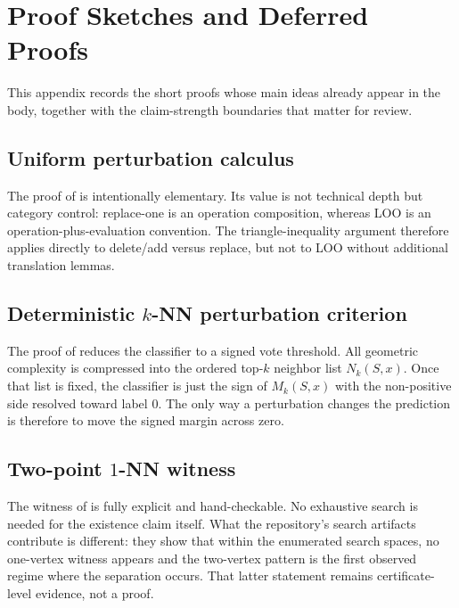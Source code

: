\section{Proof Sketches and Deferred Proofs}

This appendix records the short proofs whose main ideas already appear in the
body, together with the claim-strength boundaries that matter for review.

\subsection{Uniform perturbation calculus}

The proof of  is intentionally elementary. Its
value is not technical depth but category control: replace-one is an operation
composition, whereas LOO is an operation-plus-evaluation convention. The
triangle-inequality argument therefore applies directly to delete/add versus
replace, but not to LOO without additional translation lemmas.

\subsection[Deterministic k-NN perturbation criterion]{Deterministic $k$-NN perturbation criterion}

The proof of  reduces the classifier to a signed vote
threshold. All geometric complexity is compressed into the ordered top-$k$
neighbor list $N_k(S,x)$. Once that list is fixed, the classifier is just the
sign of $M_k(S,x)$ with the non-positive side resolved toward label $0$. The
only way a perturbation changes the prediction is therefore to move the signed
margin across zero.

\subsection[Two-point 1-NN witness]{Two-point $1$-NN witness}

The witness of  is fully explicit and
hand-checkable. No exhaustive search is needed for the existence claim itself.
What the repository's search artifacts contribute is different: they show that
within the enumerated search spaces, no one-vertex witness appears and the
two-vertex pattern is the first observed regime where the separation occurs.
That latter statement remains certificate-level evidence, not a proof.
